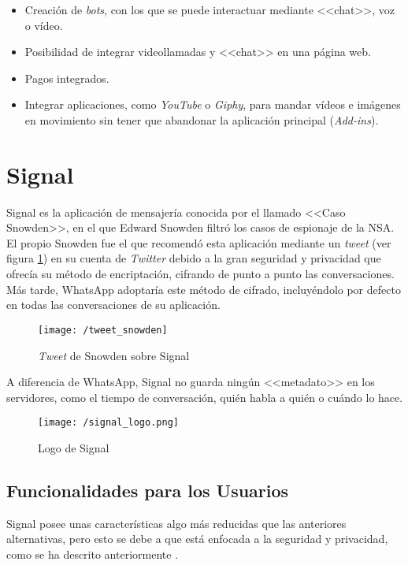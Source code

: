 \begin{itemize}
	\item Creación de \textit{bots}, con los que se puede interactuar mediante <<chat>>, voz o vídeo.
	\item Posibilidad de integrar videollamadas y <<chat>> en una página web.
	\item Pagos integrados.
	\item Integrar aplicaciones, como \textit{YouTube} o \textit{Giphy}, para mandar vídeos e imágenes en movimiento sin tener que abandonar la aplicación principal (\textit{Add-ins}).
\end{itemize}

\section{Signal}
\label{sec:signal}

Signal es la aplicación de mensajería conocida por el llamado <<Caso Snowden>>, en el que Edward Snowden filtró los casos de espionaje de la \acf{NSA}. El propio Snowden fue el que recomendó esta aplicación mediante un \textit{tweet} (ver figura \ref{fig:tweetsnowden}) en su cuenta de \textit{Twitter} debido a la gran seguridad y privacidad que ofrecía su método de encriptación, cifrando de punto a punto las conversaciones. Más tarde, WhatsApp adoptaría este método de cifrado, incluyéndolo por defecto en todas las conversaciones de su aplicación.

\begin{figure}[!h]
	\begin{center}
		\texttt{[image: /tweet\_snowden]}
		\caption{\textit{Tweet} de Snowden sobre Signal}
		\label{fig:tweetsnowden}
	\end{center}
\end{figure}

A diferencia de WhatsApp, Signal no guarda ningún <<metadato>> en los servidores, como el tiempo de conversación, quién habla a quién o cuándo lo hace.

\begin{figure}[!h]
	\begin{center}
		\texttt{[image: /signal\_logo.png]}
		\caption{Logo de Signal}
		\label{fig:signal}
	\end{center}
\end{figure}

\newpage

\subsection{Funcionalidades para los Usuarios}
Signal posee unas características algo más reducidas que las anteriores alternativas, pero esto se debe a que está enfocada a la seguridad y privacidad, como se ha descrito anteriormente \cite{Signal2017}.

